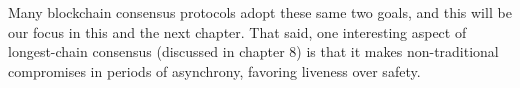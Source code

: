 Many blockchain consensus protocols adopt these same two goals, and this will be our focus
in this and the next chapter. That said, one interesting aspect of longest-chain consensus (discussed in chapter 8) is that it makes non-traditional compromises in periods of asynchrony, favoring liveness over safety.

